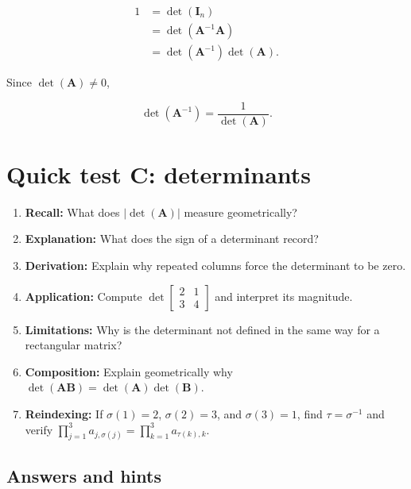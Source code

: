 \documentclass[
  australian,
  12pt,
  letterpaper,
  DIV=11,
  numbers=noendperiod,
  twoside]{scrreprt}
\providecommand{\tightlist}{%
  \setlength{\itemsep}{0pt}\setlength{\parskip}{0pt}}
\begin{document}
\[
\begin{aligned}
1
&=\det(\mathbf I_n)\\
&=\det(\mathbf A^{-1}\mathbf A)\\
&=\det(\mathbf A^{-1})\det(\mathbf A).
\end{aligned}
\]

Since \(\det(\mathbf A)\neq0\),

\[
\boxed{
\det(\mathbf A^{-1})
=
\frac{1}{\det(\mathbf A)}
}.
\]

\section*{Quick test C: determinants}\label{quick-test-c-determinants}


\begin{enumerate}
\def\labelenumi{\arabic{enumi}.}
\tightlist
\item
  \textbf{Recall:} What does \(|\det(\mathbf A)|\) measure
  geometrically?
\item
  \textbf{Explanation:} What does the sign of a determinant record?
\item
  \textbf{Derivation:} Explain why repeated columns force the
  determinant to be zero.
\item
  \textbf{Application:} Compute
  \(\det\begin{bmatrix}2&1\\3&4\end{bmatrix}\) and interpret its
  magnitude.
\item
  \textbf{Limitations:} Why is the determinant not defined in the same
  way for a rectangular matrix?
\item
  \textbf{Composition:} Explain geometrically why
  \(\det(\mathbf A\mathbf B)=\det(\mathbf A)\det(\mathbf B)\).
\item
  \textbf{Reindexing:} If \(\sigma(1)=2\), \(\sigma(2)=3\), and
  \(\sigma(3)=1\), find \(\tau=\sigma^{-1}\) and verify
  \(\prod_{j=1}^{3}a_{j,\sigma(j)}=\prod_{k=1}^{3}a_{\tau(k),k}\).
\end{enumerate}

\subsection*{Answers and hints}\label{answers-and-hints-2}
\end{document}

